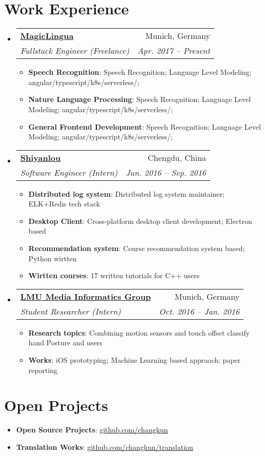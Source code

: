 \documentclass[letterpaper,11pt]{article}
\makeatletter
\newcommand{\resumeItem}[2]{
  \item\small{
    \textbf{#1}{: #2 \vspace{-2pt}}
  }
}
\newcommand{\resumeSubheading}[4]{
  \vspace{-1pt}\item
    \begin{tabular*}{0.97\textwidth}{l@{\extracolsep{\fill}}r}
      \textbf{#1} & #2 \\
      \textit{\small#3} & \textit{\small #4} \\
    \end{tabular*}\vspace{-5pt}
}
\newcommand{\resumeSubItem}[2]{\resumeItem{#1}{#2}\vspace{-4pt}}
\newcommand{\resumeSubHeadingListStart}{\begin{itemize}[leftmargin=*]}
\newcommand{\resumeSubHeadingListEnd}{\end{itemize}}
\newcommand{\resumeItemListStart}{\begin{itemize}}
\newcommand{\resumeItemListEnd}{\end{itemize}\vspace{-5pt}}
\makeatother
\begin{document}
\section{Work Experience}
  \resumeSubHeadingListStart
    \resumeSubheading
      {\href{https://magiclingua.com/}{MagicLingua}}{Munich, Germany}
      {Fullstack Engineer (Freelance)}{Apr. 2017 -- Present}
      \resumeItemListStart
        \resumeItem{Speech Recognition}
          {Speech Recognition; Language Level Modeling; angular/typescript/k8s/serverless/;}
        \resumeItem{Nature Language Processing}
          {Speech Recognition; Language Level Modeling; angular/typescript/k8s/serverless/;}
        \resumeItem{General Frontend Development}
          {Speech Recognition; Language Level Modeling; angular/typescript/k8s/serverless/;}
    \resumeItemListEnd
    \resumeSubheading
      {\href{https://shiyanlou.com/}{Shiyanlou}}{Chengdu, China}
      {Software Engineer (Intern)}{Jun. 2016 -- Sep. 2016}
      \resumeItemListStart
        \resumeItem{Distributed log system}
          {Distributed log system maintainer; ELK+Redis tech stack}
        \resumeItem{Desktop Client}
          {Cross-platform desktop client development; Electron based}
        \resumeItem{Recommendation system}
          {Course recommendation system based; Python wirtten}
        \resumeItem{Wirtten courses}
          {17 written tutorials for C++ users}
    \resumeItemListEnd
    \resumeSubheading
      {\href{http://www.medien.ifi.lmu.de}{LMU Media Informatics Group}}{Munich, Germany}
      {Student Researcher (Intern)}{Oct. 2016 -- Jan. 2016}
      \resumeItemListStart
        \resumeItem{Research topics}
          {Combining motion sensors and touch offset classify hand Posture and users}
        \resumeItem{Works}
          {iOS prototyping; Machine Learning based appraoch; paper reporting}
    \resumeItemListEnd
  \resumeSubHeadingListEnd
\section{Open Projects}
  \resumeSubHeadingListStart
    \resumeSubItem{Open Source Projects}
      {\href{https://github.com/changkun/}{github.com/changkun}}
    \resumeSubItem{Translation Works}
      {\href{https://github.com/changkun/translation}{github.com/changkun/translation}}
  \resumeSubHeadingListEnd
\end{document}
